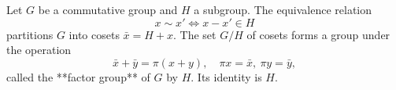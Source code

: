 Let $G$ be a commutative group and $H$ a subgroup. The equivalence relation
$$x \sim x' \iff x - x' \in H$$
partitions $G$ into cosets $\bar{x} = H + x$. The set $G/H$ of cosets forms a group under the operation
$$\bar{x} + \bar{y} = \pi(x + y), \quad \pi x = \bar{x}, \ \pi y = \bar{y},$$
called the **factor group** of $G$ by $H$. Its identity is $H$.
